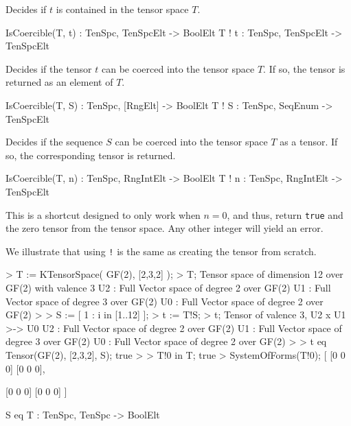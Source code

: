 Decides if $t$ is contained in the tensor space $T$.

\begin{intrinsics}
IsCoercible(T, t) : TenSpc, TenSpcElt -> BoolElt
T ! t : TenSpc, TenSpcElt -> TenSpcElt
\end{intrinsics}

Decides if the tensor $t$ can be coerced into the tensor space $T$. If so, the
tensor is returned as an element of $T$.

\begin{intrinsics}
IsCoercible(T, S) : TenSpc, [RngElt] -> BoolElt
T ! S : TenSpc, SeqEnum -> TenSpcElt
\end{intrinsics}

Decides if the sequence $S$ can be coerced into the tensor space $T$ as a
tensor. If so, the corresponding tensor is returned. 

\begin{intrinsics}
IsCoercible(T, n) : TenSpc, RngIntElt -> BoolElt
T ! n : TenSpc, RngIntElt -> TenSpcElt
\end{intrinsics}

This is a shortcut designed to only work when $n=0$, and thus, return {\tt true}
and the zero tensor from the tensor space. Any other integer will yield an
error.

\begin{example}[Coercion]
We illustrate that using \texttt{!} is the same as creating the tensor from scratch.

\begin{code}
> T := KTensorSpace( GF(2), [2,3,2] );
> T;
Tensor space of dimension 12 over GF(2) with valence 3
U2 : Full Vector space of degree 2 over GF(2)
U1 : Full Vector space of degree 3 over GF(2)
U0 : Full Vector space of degree 2 over GF(2)
> 
> S := [ 1 : i in [1..12] ];
> t := T!S;
> t;
Tensor of valence 3, U2 x U1 >-> U0
U2 : Full Vector space of degree 2 over GF(2)
U1 : Full Vector space of degree 3 over GF(2)
U0 : Full Vector space of degree 2 over GF(2)
> 
> t eq Tensor(GF(2), [2,3,2], S);
true
> 
> T!0 in T;
true
> SystemOfForms(T!0);
[
    [0 0 0]
    [0 0 0],

    [0 0 0]
    [0 0 0]
]
\end{code}

\end{example}

\begin{intrinsics}
S eq T : TenSpc, TenSpc -> BoolElt
\end{intrinsics}

